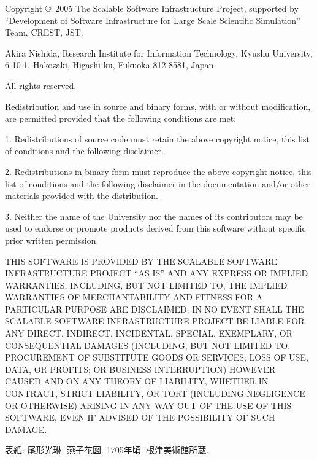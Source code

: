 \documentclass[a4paper]{jarticle}
\begin{document}
\newpage
\begin{flushleft}
{\small
Copyright \copyright\ 2005 The Scalable Software Infrastructure Project,
supported by ``Development of Software Infrastructure for Large Scale
Scientific Simulation'' Team, CREST, JST.

Akira Nishida, Research Institute for Information Technology, 
Kyushu University, 6-10-1, Hakozaki, Higashi-ku, Fukuoka 812-8581, Japan.

All rights reserved.

\vspace*{5mm}
 Redistribution and use in source and binary forms, with or without
 modification, are permitted provided that the following conditions are
 met:

 1. Redistributions of source code must retain the above copyright
 notice, this list of conditions and the following disclaimer.

 2. Redistributions in binary form must reproduce the above copyright
 notice, this list of conditions and the following disclaimer in the
 documentation and/or other materials provided with the distribution.

 3. Neither the name of the University nor the names of its contributors
 may be used to endorse or promote products derived from this software
 without specific prior written permission.

\vspace*{5mm}
 THIS SOFTWARE IS PROVIDED BY THE SCALABLE SOFTWARE INFRASTRUCTURE
 PROJECT ``AS IS'' AND ANY EXPRESS OR IMPLIED WARRANTIES, INCLUDING, BUT
 NOT LIMITED TO, THE IMPLIED WARRANTIES OF MERCHANTABILITY AND FITNESS
 FOR A PARTICULAR PURPOSE ARE DISCLAIMED. IN NO EVENT SHALL THE SCALABLE
 SOFTWARE INFRASTRUCTURE PROJECT BE LIABLE FOR ANY DIRECT, INDIRECT,
 INCIDENTAL, SPECIAL, EXEMPLARY, OR CONSEQUENTIAL DAMAGES (INCLUDING,
 BUT NOT LIMITED TO, PROCUREMENT OF SUBSTITUTE GOODS OR SERVICES; LOSS
 OF USE, DATA, OR PROFITS; OR BUSINESS INTERRUPTION) HOWEVER CAUSED AND
 ON ANY THEORY OF LIABILITY, WHETHER IN CONTRACT, STRICT LIABILITY, OR
 TORT (INCLUDING NEGLIGENCE OR OTHERWISE) ARISING IN ANY WAY OUT OF THE
 USE OF THIS SOFTWARE, EVEN IF ADVISED OF THE POSSIBILITY OF SUCH
 DAMAGE.

\vfill
表紙: 尾形光琳. 燕子花図. 1705年頃. 根津美術館所蔵.
}
\end{flushleft}
\thispagestyle{empty}

\newpage
{}
\tableofcontents

\setcounter{section}{0}
\end{document}
